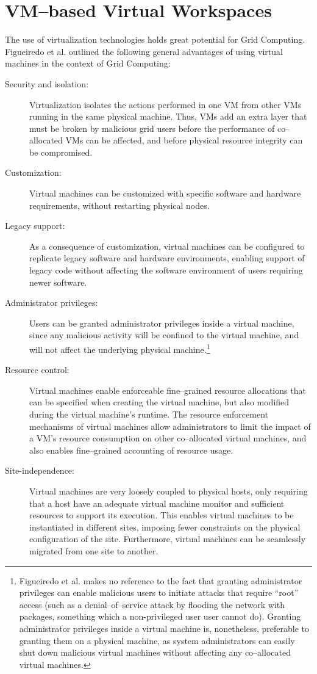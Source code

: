 \section{VM--based Virtual Workspaces}
\label{sec:vm}

The use of virtualization technologies \cite{vmbook} holds great potential for Grid Computing. Figueiredo et al.\cite{gridvm} outlined the following general advantages of using virtual machines in the context of Grid Computing:

\begin{description}
\item[Security and isolation:] Virtualization isolates the actions performed in one VM from other VMs running in the same physical machine. Thus, VMs add an extra layer that must be broken by malicious grid users before the performance of co--allocated VMs can be affected, and before physical resource integrity can be compromised.
\item[Customization:] Virtual machines can be customized with specific software and hardware requirements, without restarting physical nodes.
\item[Legacy support:] As a consequence of customization, virtual machines can be configured to replicate legacy software and hardware environments, enabling support of legacy code without affecting the software environment of users requiring newer software.
\item[Administrator privileges:] Users can be granted administrator privileges inside a virtual machine, since any malicious activity will be confined to the virtual machine, and will not affect the underlying physical machine.\footnote{Figueiredo et al. makes no reference to the fact that granting administrator privileges can enable malicious users to initiate attacks that require ``root'' access (such as a denial--of--service attack by flooding the network with packages, something which a non-privileged user user cannot do). Granting administrator privileges inside a virtual machine is, nonetheless, preferable to granting them on a physical machine, as system administrators can easily shut down malicious virtual machines without affecting any co--allocated virtual machines.}
\item[Resource control:] Virtual machines enable enforceable fine--grained resource allocations that can be specified when creating the virtual machine, but also modified during the virtual machine's runtime. The resource enforcement mechanisms of virtual machines allow administrators to limit the impact of a VM's resource consumption on other co--allocated virtual machines, and also enables fine--grained accounting of resource usage. 
\item[Site-independence:] Virtual machines are very loosely coupled to physical hosts, only requiring that a host have an adequate virtual machine monitor and sufficient resources to support its execution. This enables virtual machines to be instantiated in different sites, imposing fewer constraints on the physical configuration of the site. Furthermore, virtual machines can be seamlessly migrated from one site to another.
\end{description}

